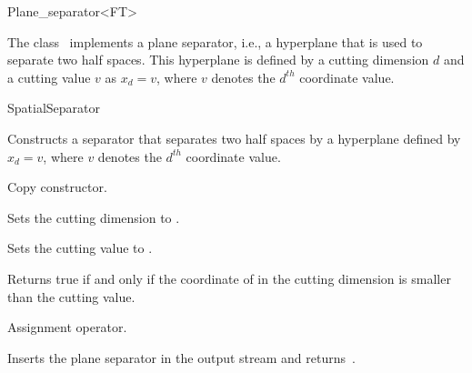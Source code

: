 

\begin{ccRefClass}{Plane_separator<FT>}  %


\begin{ccAdvanced}

\ccDefinition
  
The class \ccRefName\ implements a plane separator, i.e., a hyperplane that is used to separate two half spaces.
This hyperplane is defined by a cutting dimension $d$ and a cutting value $v$
as $x_d=v$, where $v$ denotes the $d^{th}$ coordinate value.


\ccIsModel

SpatialSeparator

\ccCreation
{}  %



{Constructs a separator that separates two half spaces by a hyperplane
defined by $x_d=v$, where $v$ denotes the $d^{th}$ coordinate value.}

{Copy constructor.}

\ccOperations

{Sets the cutting dimension to . }

{Sets the cutting value to . }



{Returns true if and only if the coordinate of  in the cutting dimension is smaller than the cutting value.}

{Assignment operator.}


{Inserts the plane separator  in the output stream  and returns~.}

\end{ccAdvanced}

\end{ccRefClass}


